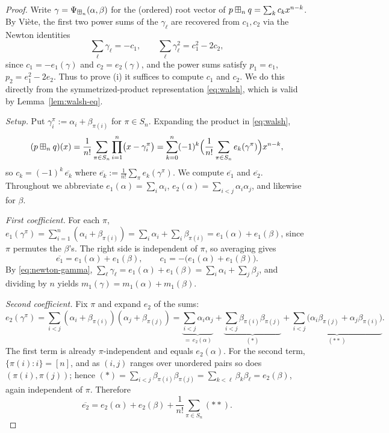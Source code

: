 \begin{proof}
Write $\gamma=\Psi_{\boxplus_n}(\alpha,\beta)$ for the (ordered) root vector of
$p\boxplus_n q=\sum_{k}c_kx^{n-k}$. By Vi\`ete, the first two power sums of the
$\gamma_\ell$ are recovered from $c_1,c_2$ via the Newton identities
\begin{equation}\label{eq:newton-gamma}
\sum_{\ell}\gamma_\ell=-c_1,\qquad
\sum_{\ell}\gamma_\ell^2=c_1^2-2c_2,
\end{equation}
since $c_1=-e_1(\gamma)$ and $c_2=e_2(\gamma)$, and the power sums satisfy
$p_1=e_1$, $p_2=e_1^2-2e_2$. Thus to prove (i) it suffices to compute $c_1$ and
$c_2$. We do this directly from the symmetrized-product representation
\eqref{eq:walsh}, which is valid by Lemma~\ref{lem:walsh-eq}.

\smallskip\noindent\emph{Setup.}
Put $\gamma_i^\pi:=\alpha_i+\beta_{\pi(i)}$ for $\pi\in S_n$. Expanding the
product in \eqref{eq:walsh},
\[
(p\boxplus_n q)(x)=\frac1{n!}\sum_{\pi\in S_n}\prod_{i=1}^n\bigl(x-\gamma_i^\pi\bigr)
=\sum_{k=0}^n(-1)^k\Bigl(\frac1{n!}\sum_{\pi\in S_n}e_k(\gamma^\pi)\Bigr)x^{n-k},
\]
so $c_k=(-1)^k\,\overline{e_k}$ where $\overline{e_k}:=\frac1{n!}\sum_{\pi}e_k(\gamma^\pi)$.
We compute $\overline{e_1}$ and $\overline{e_2}$. Throughout we abbreviate
$e_1(\alpha)=\sum_i\alpha_i$, $e_2(\alpha)=\sum_{i<j}\alpha_i\alpha_j$, and
likewise for $\beta$.

\smallskip\noindent\emph{First coefficient.}
For each $\pi$,
$e_1(\gamma^\pi)=\sum_{i=1}^n(\alpha_i+\beta_{\pi(i)})
=\sum_i\alpha_i+\sum_i\beta_{\pi(i)}=e_1(\alpha)+e_1(\beta)$,
since $\pi$ permutes the $\beta$'s. The right side is independent of $\pi$, so
averaging gives
\begin{equation}\label{eq:c1}
\overline{e_1}=e_1(\alpha)+e_1(\beta),\qquad
c_1=-\bigl(e_1(\alpha)+e_1(\beta)\bigr).
\end{equation}
By \eqref{eq:newton-gamma}, $\sum_\ell\gamma_\ell=e_1(\alpha)+e_1(\beta)=\sum_i\alpha_i+\sum_j\beta_j$,
and dividing by $n$ yields $m_1(\gamma)=m_1(\alpha)+m_1(\beta)$.

\smallskip\noindent\emph{Second coefficient.}
Fix $\pi$ and expand $e_2$ of the sums:
\[
e_2(\gamma^\pi)=\sum_{i<j}(\alpha_i+\beta_{\pi(i)})(\alpha_j+\beta_{\pi(j)})
=\underbrace{\sum_{i<j}\alpha_i\alpha_j}_{=\,e_2(\alpha)}
+\underbrace{\sum_{i<j}\beta_{\pi(i)}\beta_{\pi(j)}}_{(\ast)}
+\underbrace{\sum_{i<j}\bigl(\alpha_i\beta_{\pi(j)}+\alpha_j\beta_{\pi(i)}\bigr)}_{(\ast\ast)} .
\]
The first term is already $\pi$-independent and equals $e_2(\alpha)$. For the
second term, $\{\pi(i):i\}=[n]$, and as $(i,j)$ ranges over unordered pairs so
does $(\pi(i),\pi(j))$; hence $(\ast)=\sum_{i<j}\beta_{\pi(i)}\beta_{\pi(j)}
=\sum_{k<\ell}\beta_k\beta_\ell=e_2(\beta)$, again independent of $\pi$. Therefore
\begin{equation}\label{eq:e2-avg-split}
\overline{e_2}=e_2(\alpha)+e_2(\beta)+\frac1{n!}\sum_{\pi\in S_n}(\ast\ast).
\end{equation}


\end{proof}
